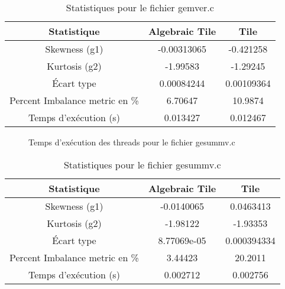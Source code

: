 \documentclass{article}
\begin{document}
\begin{table}[htbp]
  \centering
  \caption{Statistiques pour le fichier gemver.c}
  \begin{tabular}{|c|c|c|}
    \hline
    Statistique & Algebraic Tile & Tile \\ 
    \hline
    Skewness (g1) & -0.00313065 & -0.421258 \\ 
    Kurtosis (g2) & -1.99583 & -1.29245 \\ 
    Écart type & 0.00084244 & 0.00109364 \\ 
    Percent Imbalance metric en \% & 6.70647 & 10.9874 \\ 
    Temps d'exécution (s) &  0.013427      &  0.012467    \\ 
    \hline
  \end{tabular}
\end{table}
\newpage

\begin{figure}
  \centering
  \caption{Temps d'exécution des threads pour le fichier gesummv.c}
  \label{fig:gesummv.c}
\end{figure}

\begin{table}[htbp]
  \centering
  \caption{Statistiques pour le fichier gesummv.c}
  \begin{tabular}{|c|c|c|}
    \hline
    Statistique & Algebraic Tile & Tile \\ 
    \hline
    Skewness (g1) & -0.0140065 & 0.0463413 \\ 
    Kurtosis (g2) & -1.98122 & -1.93353 \\ 
    Écart type & 8.77069e-05 & 0.000394334 \\ 
    Percent Imbalance metric en \% & 3.44423 & 20.2011 \\ 
    Temps d'exécution (s) &  0.002712      &  0.002756    \\ 
    \hline
  \end{tabular}
\end{table}
\newpage
\end{document}
